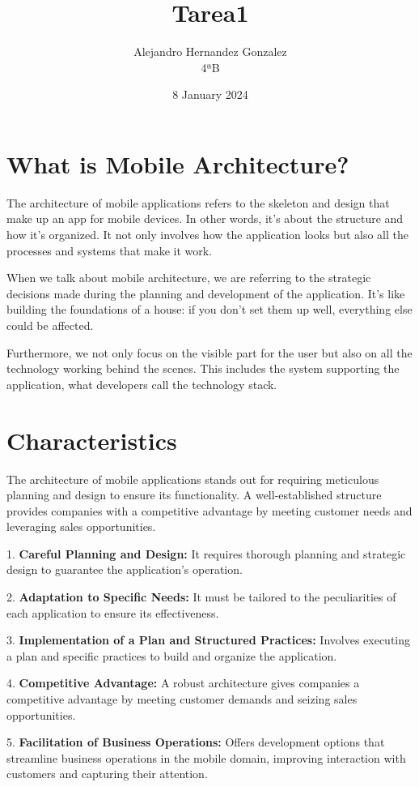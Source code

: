 \documentclass{article}
\title{Tarea1}
\author{Alejandro Hernandez Gonzalez\\ 
4ªB}
\date{8 January 2024}
\begin{document}
\maketitle

\section{What is Mobile Architecture?}
The architecture of mobile applications refers to the skeleton and design that make up an app for mobile devices. In other words, it's about the structure and how it's organized. It not only involves how the application looks but also all the processes and systems that make it work.

When we talk about mobile architecture, we are referring to the strategic decisions made during the planning and development of the application. It's like building the foundations of a house: if you don't set them up well, everything else could be affected.

Furthermore, we not only focus on the visible part for the user but also on all the technology working behind the scenes. This includes the system supporting the application, what developers call the technology stack.

\section{Characteristics}
The architecture of mobile applications stands out for requiring meticulous planning and design to ensure its functionality. A well-established structure provides companies with a competitive advantage by meeting customer needs and leveraging sales opportunities.

1. \textbf{Careful Planning and Design:} It requires thorough planning and strategic design to guarantee the application's operation.

2. \textbf{Adaptation to Specific Needs:} It must be tailored to the peculiarities of each application to ensure its effectiveness.

3. \textbf{Implementation of a Plan and Structured Practices:} Involves executing a plan and specific practices to build and organize the application.

4. \textbf{Competitive Advantage:} A robust architecture gives companies a competitive advantage by meeting customer demands and seizing sales opportunities.

5. \textbf{Facilitation of Business Operations:} Offers development options that streamline business operations in the mobile domain, improving interaction with customers and capturing their attention.
\end{document}
